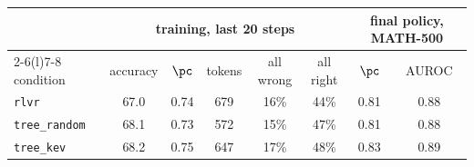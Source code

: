 \begin{tabular}{@{}lccccccc@{}}
\toprule
 & \multicolumn{5}{c}{training, last 20 steps} & \multicolumn{2}{c}{final policy, MATH-500} \\ \cmidrule(lr){2-6}\cmidrule(l){7-8}
condition & accuracy & \kev{} $\pc$ & tokens & all wrong & all right & \kev{} $\pc$ & \kev{} AUROC \\ \midrule
\texttt{rlvr} & 67.0 & 0.74 & 679 & 16\% & 44\% & 0.81 & 0.88 \\
\texttt{tree\_random} & 68.1 & 0.73 & 572 & 15\% & 47\% & 0.81 & 0.88 \\
\texttt{tree\_kev} & 68.2 & 0.75 & 647 & 17\% & 48\% & 0.83 & 0.89 \\
\bottomrule
\end{tabular}
